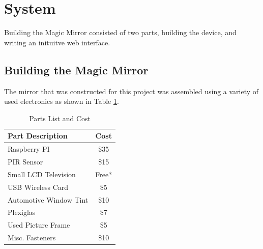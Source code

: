 \documentclass[conference]{IEEEtran}
\begin{document}



\section{System} 
Building the Magic Mirror consisted of two parts, building the device, and writing an inituitve web interface.
\subsection{Building the Magic Mirror}
The mirror that was constructed for this project was assembled using a variety of used electronics as shown in Table \ref{tab:cost}.


\begin{table}[!t]
\renewcommand{\arraystretch}{1.3}
\caption{Parts List and Cost}
\label{tab:cost}
\centering
\begin{tabular}{|l||c|}
\hline
Part Description & Cost\\
\hline
\hline
Raspberry PI & \$35\\
\hline
PIR Sensor & \$15\\
\hline
Small LCD Television & Free*\\
\hline
USB Wireless Card & \$5\\
\hline
Automotive Window Tint & \$10\\
\hline
Plexiglas & \$7\\
\hline
Used Picture Frame & \$5\\
\hline
Misc. Fasteners & \$10\\
\hline
\end{tabular}
\end{table}
\end{document}
